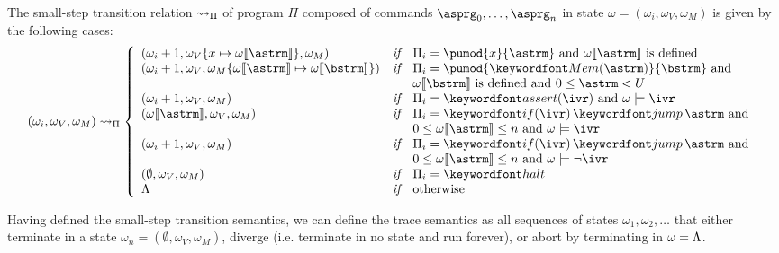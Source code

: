 \documentclass[11pt,twoside]{scrartcl}
\begin{document}
\begin{definition}
The small-step transition relation $\rightsquigarrow_\Pi$ of program $\Pi$ composed of commands $\asprg_0,\ldots,\asprg_n$ in state $\omega = (\omega_i,\omega_V,\omega_M)$ is given by the following cases:
\[
(\omega_i,\omega_V,\omega_M) \smallstep_\Pi
\left\{
\begin{array}{lcl}
(\omega_i+1, \memupd{\omega_V}{x}{\omega\llbracket\astrm\rrbracket}, \omega_M) & \textit{if} & \Pi_i = \pumod{x}{\astrm}~\text{and}~\omega\llbracket\astrm\rrbracket~\text{is defined}

\\

(\omega_i+1, \omega_V, \memupd{\omega_M}{\omega\llbracket\astrm\rrbracket}{\omega\llbracket\bstrm\rrbracket}) & \textit{if} & \Pi_i = \pumod{\pderef{\astrm}}{\bstrm}~\text{and} \\
 & & \omega\llbracket\bstrm\rrbracket~\text{is defined}~\text{and}~0\le\astrm<\maxmem

\\

(\omega_i+1, \omega_V, \omega_M) & \textit{if} & \Pi_i = \passert{\ivr}~\text{and}~\omega\models\ivr

\\

(\omega\llbracket\astrm\rrbracket, \omega_V, \omega_M) & \textit{if} & \Pi_i = \pifjump{\ivr}{\astrm}~\text{and} \\
 & & 0 \le \omega\llbracket\astrm\rrbracket \le n~\text{and}~\omega\models\ivr

\\

(\omega_i+1, \omega_V, \omega_M) & \textit{if} & \Pi_i = \pifjump{\ivr}{\astrm}~\text{and}~ \\
 & & 0 \le \omega\llbracket\astrm\rrbracket \le n~\text{and}~\omega\models\lnot\ivr

\\

(\emptyset, \omega_V, \omega_M) & \textit{if} & \Pi_i = \phalt

\\

\errstate & \textit{if} & \text{otherwise}

\end{array}
\right.
\]
\end{definition}

Having defined the small-step transition semantics, we can define the trace semantics as all sequences of states $\omega_1, \omega_2, \ldots$ that either terminate in a state $\omega_n=(\emptyset,\omega_V,\omega_M)$, diverge (i.e. terminate in no state and run forever), or abort by terminating in $\omega = \Lambda$.
\end{document}
